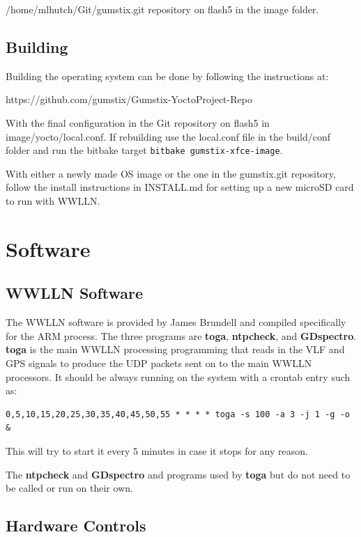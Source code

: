 /home/mlhutch/Git/gumstix.git repository on flash5 in the image folder.

\subsection{Building}

Building the operating system can be done by following the instructions at:

https://github.com/gumstix/Gumstix-YoctoProject-Repo

With the final configuration in the Git repository on flash5 in image/yocto/local.conf.
If rebuilding use the local.conf file in the build/conf folder and run the bitbake target \texttt{bitbake gumstix-xfce-image}.

With either a newly made OS image or the one in the gumstix.git repository, follow the install instructions in INSTALL.md for setting up a new microSD card to run with WWLLN.

\section{Software}

\subsection{WWLLN Software}

The WWLLN software is provided by James Brundell and compiled specifically for the ARM process.
The three programs are {\bf toga}, {\bf ntpcheck}, and {\bf GDspectro}.
{\bf toga} is the main WWLLN processing programming that reads in the VLF and GPS signals to produce the UDP packets sent on to the main WWLLN processors.
It should be always running on the system with a crontab entry such as:

\begin{verbatim}
0,5,10,15,20,25,30,35,40,45,50,55 * * * * toga -s 100 -a 3 -j 1 -g -o &
\end{verbatim}

This will try to start it every 5 minutes in case it stops for any reason.

The {\bf ntpcheck} and {\bf GDspectro} and programs used by {\bf toga} but do not need to be called or run on their own.

\subsection{Hardware Controls}

